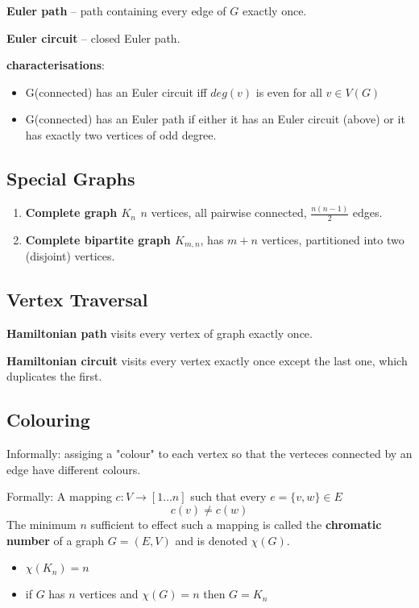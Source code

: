 \documentclass{ctexart}
\begin{document}
\textbf{Euler path} -- path containing every edge of $G$ exactly once. 

\textbf{Euler circuit} -- closed Euler path.

\textbf{characterisations}:
\begin{itemize}[leftmargin = 50 pt]
    \item G(connected) has an Euler circuit iff $deg(v)$ is even for all $v \in V(G)$
    \item G(connected) has an Euler path if either it has an Euler circuit (above) or it has exactly two vertices of odd degree.
\end{itemize}

\subsection{Special Graphs}

\begin{enumerate}
    \item \textbf{Complete graph $K_n$ $n$} vertices, all pairwise connected, $\frac{n(n-1)}{2}$ edges.
    \item \textbf{Complete bipartite graph $K_{m,n}$}, has $m+n$ vertices, partitioned into two (disjoint) vertices.
\end{enumerate}

\subsection{Vertex Traversal}

\textbf{Hamiltonian path} visits every vertex of graph exactly once.

\textbf{Hamiltonian circuit} visits every vertex exactly once except the last one, which duplicates the first.

\subsection{Colouring}

Informally: assiging a "colour" to each vertex so that the verteces connected by an edge have different colours.

Formally: A mapping $c : V \rightarrow \left[ 1 \ldots n \right] $ such that every $e = \{v,w\} \in E$
\[
    c(v) \neq c(w)
\]
The minimum $n$ sufficient to effect such a mapping is called the \textbf{chromatic number} of a graph $G = (E, V)$ and is denoted $\chi (G)$.

\begin{itemize}
    \item $\chi (K_n) = n$
    \item if $G$ has $n$ vertices and $\chi (G) = n$ then $G = K_n$
\end{itemize}
\end{document}

